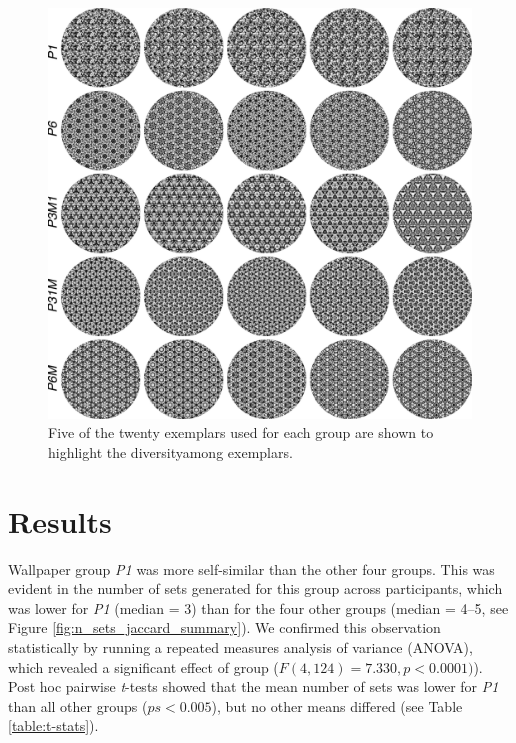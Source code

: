 \documentclass[symmetry,article,accept,pdftex,moreauthors]{Definitions/mdpi}
\begin{document}
\begin{figure}[H]

	\includegraphics[scale=0.6]{./figures//wpg_exemplars.pdf}
	\caption{Five of the twenty exemplars used for each group are shown to highlight the diversity\linebreak among exemplars.}
	\label{fig:wpg_exemplars}
\end{figure}

\section{Results}
Wallpaper group \textit{P1} was more self-similar than the other four groups. This was evident in the number of sets generated for this group across participants, which was lower for \textit{P1} (median = 3) than for the four other groups (median = 4--5, see Figure \ref{fig:n_sets_jaccard_summary}). We confirmed this observation statistically by running a repeated measures analysis of variance (ANOVA), which revealed a significant effect of group ($F(4, 124) = 7.330, p < 0.0001)$). Post hoc pairwise \textit{t}-tests showed that the mean number of sets was lower for \textit{P1} than all other groups ($ps < 0.005$), but no other means differed (see Table \ref{table:t-stats}).
\end{document}
